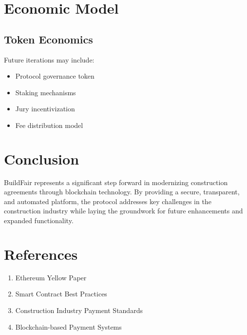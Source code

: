 \documentclass[12pt]{article}
\begin{document}
\section{Economic Model}
\subsection{Token Economics}
Future iterations may include:
\begin{itemize}
    \item Protocol governance token
    \item Staking mechanisms
    \item Jury incentivization
    \item Fee distribution model
\end{itemize}

\section{Conclusion}
BuildFair represents a significant step forward in modernizing construction agreements through blockchain technology. By providing a secure, transparent, and automated platform, the protocol addresses key challenges in the construction industry while laying the groundwork for future enhancements and expanded functionality.

\section{References}
\begin{enumerate}
    \item Ethereum Yellow Paper
    \item Smart Contract Best Practices
    \item Construction Industry Payment Standards
    \item Blockchain-based Payment Systems
\end{enumerate}
\end{document}
